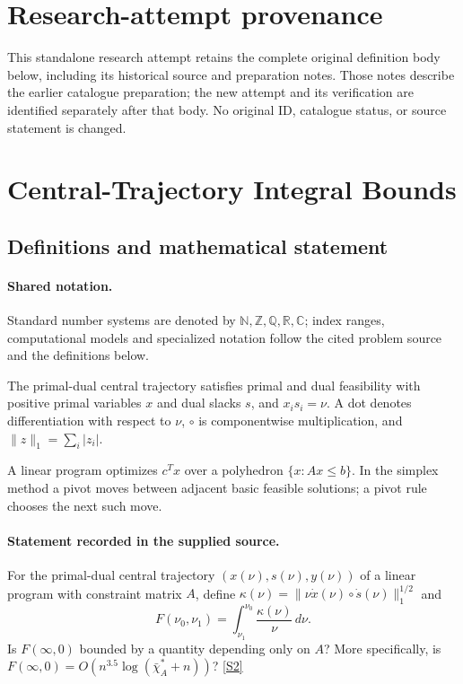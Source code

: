 \documentclass[11pt]{article}
\begin{document}
\section*{Research-attempt provenance}
This standalone research attempt retains the complete original definition body below,
including its historical source and preparation notes. Those notes describe the
earlier catalogue preparation; the new attempt and its verification are identified
separately after that body. No original ID, catalogue status, or source statement is changed.

\section{Central-Trajectory Integral Bounds}\label{statement}

\subsection{Definitions and mathematical statement}

\paragraph{Shared notation.}Standard number systems are denoted by $\mathbb N,\mathbb Z,\mathbb Q,\mathbb R,\mathbb C$; index ranges, computational models and specialized notation follow the cited problem source and the definitions below.


The primal-dual central trajectory satisfies primal and dual feasibility with positive primal variables $x$ and dual slacks $s$, and $x_i s_i=\nu$. A dot denotes differentiation with respect to $\nu$, $\circ$ is componentwise multiplication, and $\lVert z\rVert_1=\sum_i|z_i|$.

A linear program optimizes $c^Tx$ over a polyhedron $\{x:Ax\leq b\}$. In the simplex method a pivot moves between adjacent basic feasible solutions; a pivot rule chooses the next such move.
\paragraph{Statement recorded in the supplied source.}
For the primal-dual central trajectory $(x(\nu),s(\nu),y(\nu))$ of a linear program with constraint matrix $A$, define $\kappa(\nu)=\lVert\nu\dot x(\nu)\circ\dot s(\nu)\rVert_1^{1/2}$ and $$F(\nu_0,\nu_1)=\int_{\nu_1}^{\nu_0}\frac{\kappa(\nu)}{\nu}\,d\nu.$$ Is $F(\infty,0)$ bounded by a quantity depending only on $A$? More specifically, is $F(\infty,0)=O\!\left(n^{3.5}\log(\bar\chi_A^*+n)\right)$? \href{https://doi.org/10.4171/owr/2005/02}{[S2]}
\end{document}
